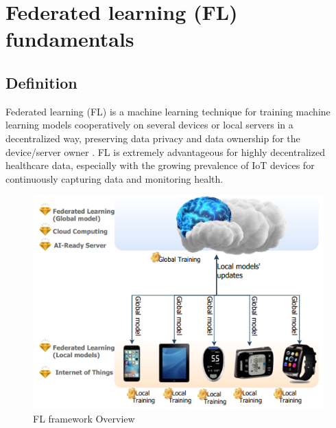 

\section{Federated learning (FL) fundamentals} \label{4fedlea}

\subsection{Definition}
Federated learning (FL) is a machine learning technique for training machine learning models cooperatively on several devices or local servers in a decentralized way, preserving data privacy and data ownership for the device/server owner \cite{fl8}. FL is extremely advantageous for highly decentralized healthcare data, especially with the growing prevalence of IoT devices for continuously capturing data and monitoring health.


\begin{figure}[H]
\centering
\includegraphics[scale=0.6]{img/fl_overview.png}
\caption{FL framework Overview}
\label{fig:fl_overview}
\end{figure}

